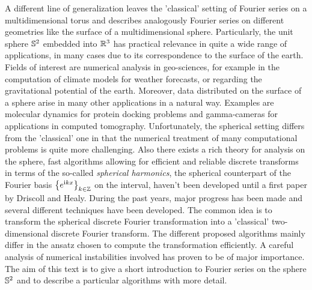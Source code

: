 A different line of generalization leaves the 'classical' setting of 
Fourier series on a multidimensional torus and describes analogously
Fourier series on different geometries like the surface of a
multidimensional sphere. Particularly, the unit sphere $\mathbb{S}^2$ 
embedded into $\mathbb{R}^3$ has practical relevance in quite a wide range of 
applications, in many cases due to its correspondence to the surface 
of the earth. Fields of interest are numerical analysis in
geo-sciences, for example in the computation of climate models for
weather forecasts, or regarding the gravitational potential of the 
earth. Moreover, data distributed on the surface of a sphere arise
in many other applications in a natural way. Examples are
molecular dynamics for protein docking problems and 
gamma-cameras for applications in computed tomography.
Unfortunately, the spherical setting differs from the 'classical' 
one in that the numerical treatment of many computational problems
is quite more challenging. Also there exists a rich theory for 
analysis on the sphere, fast algorithms allowing for efficient and
reliable discrete transforms in terms of the so-called 
\emph{spherical harmonics}, the spherical counterpart of the 
Fourier basis $\left\{e^{\mbox{\scriptsize\rm{i}} k x}\right\rbrace_{k \in \mathbb{Z}}$ on the interval,
haven't been developed until a first paper by Driscoll and Healy. 
During the past years, major progress has been made and several 
different techniques have been developed. The common idea is to
transform the spherical discrete Fourier transformation into a
'classical' two-dimensional discrete Fourier transform. The
different proposed algorithms mainly differ in the ansatz chosen
to compute the transformation efficiently. A careful analysis
of numerical instabilities involved has proven to be of major 
importance.
The aim of this text is to give a short introduction to Fourier 
series on the sphere $\mathbb{S}^2$ and to describe a particular
algorithms with more detail. 